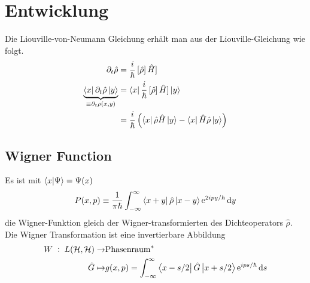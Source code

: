 \chapter{Entwicklung}
Die Liouville-von-Neumann Gleichung erhält man aus der Liouville-Gleichung wie folgt.
\begin{align}
  \partial_t \hat{\rho} &= \frac{i}{\hbar}\left[\hat{\rho} \right] \hat{H}] \\
  \underbrace{\bra{x} \partial_t \hat{\rho} \ket{y}}_{\equiv \partial_t \rho(x,y)} &= \bra{x}\frac{i}{\hbar}\left[\hat{\rho} \right] \hat{H}]\ket{y} \\
   &= \frac{i}{\hbar} \left( \bra{x} \hat{\rho} \hat{H}\ket{y} - \bra{x}\hat{H}\hat{\rho} \ket{y} \right)
\end{align}


\section{Wigner Function}
Es ist mit $\bra{x}\ket{\Psi} = \Psi(x)$
\begin{equation}
  P(x,p) \equiv \frac{1}{\pi\hbar} \int_{-\infty}^{\infty} \bra{x+y}\hat{\rho} \ket{x-y} \text{e}^{2ipy/\hbar} \mathop{}\!\mathrm{d} y
\end{equation}
die Wigner-Funktion gleich der Wigner-transformierten des Dichteoperators $\hat{\rho}$. Die Wigner Transformation ist eine invertierbare Abbildung
\begin{align}
  W\; :\; L(\mathcal{H},\mathcal{H})  \rightarrow & \text{Phasenraum}^* \\
   \hat{G} \mapsto & g(x,p) = \int_{-\infty}^{\infty} \bra{x-s/2}\hat{G} \ket{x+s/2} \text{e}^{ips/\hbar} \mathop{}\!\mathrm{d} s
\end{align}
